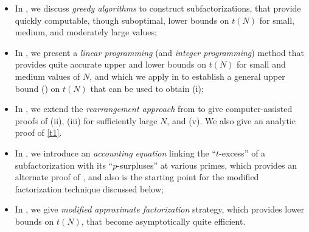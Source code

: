 \documentclass[12pt,a4paper,reqno]{amsart}
\numberwithin{equation}{section}
\theoremstyle{plain}
\theoremstyle{definition}
\begin{document}
\begin{itemize}
  \item In , we discuss \emph{greedy algorithms} to construct subfactorizations, that provide quickly computable, though suboptimal, lower bounds on $t(N)$ for small, medium, and moderately large values;
  \item In , we present a \emph{linear programming} (and \emph{integer programming}) method that provides quite accurate upper and lower bounds on $t(N)$ for small and medium values of $N$, and which we apply in  to establish a general upper bound () on $t(N)$ that can be used to obtain (i);
  \item In , we extend the \emph{rearrangement approach} from \cite{guy-selfridge} to give computer-assisted proofs of (ii), (iii) for sufficiently large $N$, and (v).  We also give an analytic proof of \eqref{t1}.
  \item In , we introduce an \emph{accounting equation} linking the ``$t$-excess'' of a subfactorization with its ``$p$-surpluses'' at various primes, which provides an alternate proof of , and also is the starting point for the modified factorization technique discussed below;
  \item In , we give \emph{modified approximate factorization} strategy, which provides lower bounds on $t(N)$, that become asymptotically quite efficient.
\end{itemize}
\end{document}
